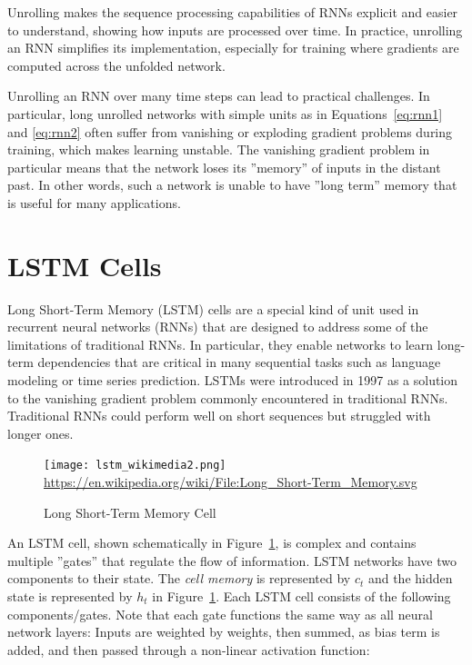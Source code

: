 Unrolling makes the sequence processing capabilities of RNNs explicit and easier to understand, showing how inputs are processed over time. In practice, unrolling an RNN simplifies its implementation, especially for training where gradients are computed across the unfolded network. 

Unrolling an RNN over many time steps can lead to practical challenges. In particular, long unrolled networks with simple units as in Equations~\ref{eq:rnn1} and \ref{eq:rnn2} often suffer from vanishing or exploding gradient problems during training, which makes learning unstable. The vanishing gradient problem in particular means that the network loses its ''memory'' of inputs in the distant past. In other words, such a network is unable to have ''long term'' memory that is useful for many applications.

\section{LSTM Cells}

Long Short-Term Memory (LSTM) cells are a special kind of unit used in recurrent neural networks (RNNs) that are designed to address some of the limitations of traditional RNNs. In particular, they enable networks to learn long-term dependencies that are critical in many sequential tasks such as language modeling or time series prediction. LSTMs were introduced in 1997 as a solution to the vanishing gradient problem commonly encountered in traditional RNNs. Traditional RNNs could perform well on short sequences but struggled with longer ones.

\begin{figure}
\centering

\texttt{[image: lstm\_wikimedia2.png]}
\scriptsize \url{https://en.wikipedia.org/wiki/File:Long_Short-Term_Memory.svg} \normalsize
\caption{Long Short-Term Memory Cell}
\label{fig:lstm}
\end{figure}

An LSTM cell, shown schematically in Figure~\ref{fig:lstm}, is complex and contains multiple ''gates'' that regulate the flow of information. LSTM networks have two components to their state. The \emph{cell memory} is represented by $c_t$ and the hidden state is represented by $h_t$ in Figure~\ref{fig:lstm}. Each LSTM cell consists of the following components/gates. Note that each gate functions the same way as all neural network layers: Inputs are weighted by weights, then summed, as bias term is added, and then passed through a non-linear activation function:

